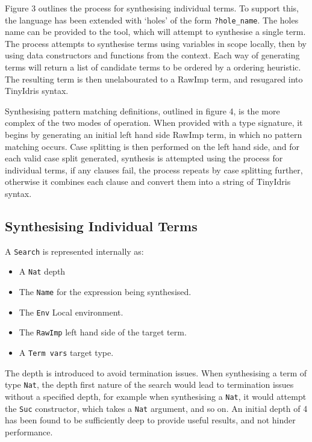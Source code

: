 \documentclass[a4paper]{article}
\begin{document}
Figure 3 outlines the process for synthesising individual terms.
To support this, the language has been extended with `holes' of
the form \texttt{?hole\_name}. The holes name can be provided to
the tool, which will attempt to synthesise a single term. 
The process attempts to synthesise terms using variables in scope
locally, then by using data constructors and functions from the
context. Each way of generating terms will return a list of candidate
terms to be ordered by a ordering heuristic. The resulting term is then
unelabourated to a RawImp term, and resugared into TinyIdris syntax.

Synthesising pattern matching definitions, outlined in figure 4,
is the more complex of the two modes of operation. When provided with
a type signature, it begins by generating an initial left hand side
RawImp term, in which no pattern matching occurs. Case splitting is
then performed on the left hand side, and for each valid case split
generated, synthesis is attempted using the process for individual
terms, if any clauses fail, the process repeats by case splitting
further, otherwise it combines each clause and convert them into a
string of TinyIdris syntax. 


\subsection{Synthesising Individual Terms}
\label{sec:orgc850bb8}

A \texttt{Search} is represented internally as: 
\begin{itemize}
\item A \texttt{Nat} depth
\item The \texttt{Name} for the expression being synthesised.
\item The \texttt{Env} Local environment.
\item The \texttt{RawImp} left hand side of the target term.
\item A \texttt{Term vars} target type.
\end{itemize}

The depth is introduced to avoid termination issues. When synthesising a term of type \texttt{Nat}, the depth first nature of the 
search would lead to termination issues without a specified depth, for example when synthesising a \texttt{Nat}, it would attempt 
the \texttt{Suc} constructor, which takes a \texttt{Nat} argument, and so on. An initial depth of 4 has been found to be sufficiently deep 
to provide useful results, and not hinder performance. 
\end{document}
